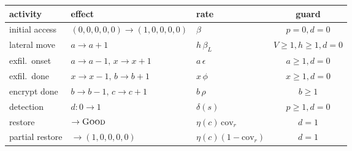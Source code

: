 \setlength{\tabcolsep}{2pt}\scriptsize
\begin{tabular}{@{}lllc@{}}
\toprule
activity & effect & rate & guard\\
\midrule
initial access & $(0,0,0,0,0)\!\to\!(1,0,0,0,0)$ & $\beta$ & $p{=}0,d{=}0$\\
lateral move & $a\!\to\!a{+}1$ & $h\,\beta_L$ & $V{\ge}1,h{\ge}1,d{=}0$\\
exfil.\ onset & $a\!\to\!a{-}1,\,x\!\to\!x{+}1$ & $a\,\epsilon$ & $a{\ge}1,d{=}0$\\
exfil.\ done & $x\!\to\!x{-}1,\,b\!\to\!b{+}1$ & $x\,\phi$ & $x{\ge}1,d{=}0$\\
encrypt done & $b\!\to\!b{-}1,\,c\!\to\!c{+}1$ & $b\,\rho$ & $b{\ge}1$\\
detection & $d\!:\!0\!\to\!1$ & $\delta(s)$ & $p{\ge}1,d{=}0$\\
restore & $\to\textsc{Good}$ & $\eta(c)\,\mathrm{cov}_r$ & $d{=}1$\\
partial restore & $\to(1,0,0,0,0)$ & $\eta(c)(1{-}\mathrm{cov}_r)$ & $d{=}1$\\
\bottomrule
\end{tabular}
